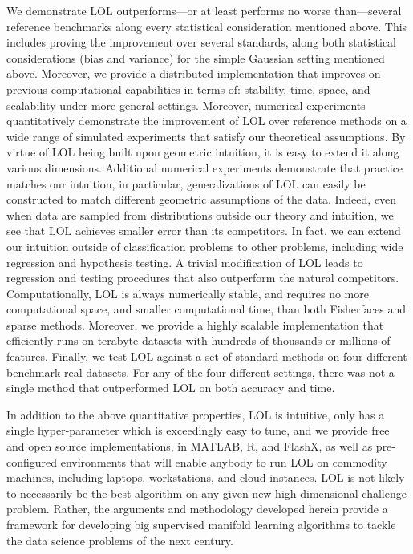 \documentclass[10pt]{article}
\begin{document}
We demonstrate LOL outperforms---or at least performs no worse than---several reference benchmarks along every statistical consideration mentioned above.  This includes proving the improvement over several standards, along both statistical considerations (bias and variance) for the simple Gaussian setting mentioned above. Moreover, we provide a distributed implementation that improves on previous computational capabilities in terms of: stability, time, space, and scalability under more general settings.  Moreover, numerical experiments quantitatively demonstrate the improvement of LOL over reference methods on a wide range of simulated experiments that satisfy our theoretical assumptions. By virtue of LOL being built upon geometric intuition, it is easy to extend it along various dimensions.  Additional numerical experiments demonstrate that practice matches our intuition, in particular, generalizations of LOL can easily be constructed to match different geometric assumptions of the data.  Indeed, even when data are sampled from distributions outside our theory and intuition, we see that LOL achieves smaller error than its competitors. In fact, we can extend our intuition outside of classification problems to other problems, including wide regression and hypothesis testing.  A trivial modification of LOL leads to regression and testing procedures that also outperform the natural competitors.  Computationally, LOL is always numerically stable, and requires no more computational space, and smaller computational time, than both Fisherfaces and sparse methods.  Moreover, we provide a highly scalable implementation that efficiently runs on terabyte datasets with hundreds of thousands or millions of features. Finally, we test LOL against a set of standard methods on four different benchmark real datasets.  For any of the four different settings, there was not a single method that outperformed LOL on both accuracy and time.

In addition to the above quantitative properties, LOL is intuitive, only has a single hyper-parameter which is exceedingly easy to tune, and we provide free and open source implementations, in MATLAB, R, and FlashX, as well as pre-configured environments that will enable anybody to run LOL on commodity machines, including laptops, workstations, and cloud instances.  LOL is not likely to necessarily be the best algorithm on any given new high-dimensional challenge problem.  Rather, the arguments and methodology developed herein provide a framework for developing big supervised manifold learning algorithms to tackle the data science problems of the next century.
\end{document}
